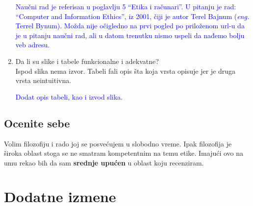 \documentclass[a4paper]{report}
\newcommand{\odgovor}[1]{\textcolor{blue}{#1}}
\begin{document}
\begin{enumerate}
\odgovor{Naučni rad je referisan u poglavlju 5 ``Etika i računari''. U pitanju je rad: ``Computer and Information Ethics'', iz 2001, čiji je autor Terel Bajnum (\textit{eng.} Terrel Bynum). Možda nije očigledno na prvi pogled po priloženom url-u da je u pitanju naučni rad, ali u datom trenutku nismo uspeli da nađemo bolju veb adresu.}

\item Da li su slike i tabele funkcionalne i adekvatne?\\
Ispod slika nema izvor. Tabeli fali opis šta koja vrsta opisuje jer je druga vrsta neintuitivna.

\odgovor{Dodat opis tabeli, kao i izvod slika.}

\end{enumerate}

\section{Ocenite sebe}
Volim filozofiju i rado joj se posvećujem u slobodno vreme. Ipak filozofija je široka oblast stoga se ne smatram
kompetentnim na temu etike. Imajući ovo na umu rekao bih da sam \textbf{srednje upućen} u oblast koju recenziram.



\chapter{Dodatne izmene}
\end{document}

